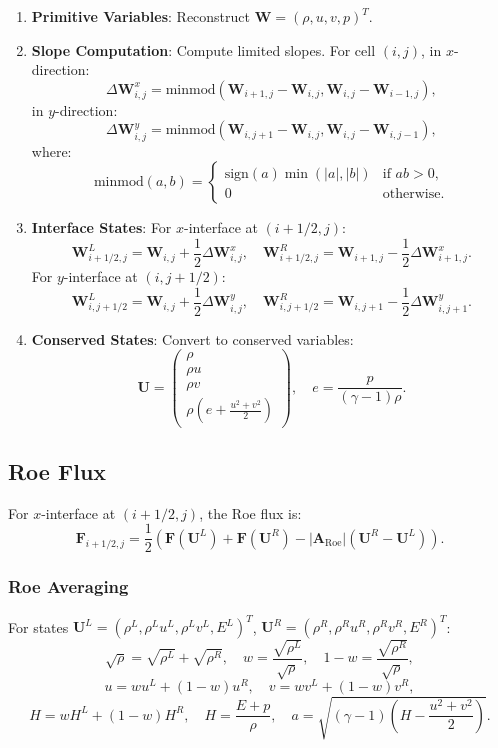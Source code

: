 \documentclass[a4paper,12pt]{article}
\begin{document}
\begin{enumerate}
    \item \textbf{Primitive Variables}: Reconstruct \(\mathbf{W} = (\rho, u, v, p)^T\).
    \item \textbf{Slope Computation}: Compute limited slopes. For cell \((i,j)\), in \(x\)-direction:
    \[
    \Delta \mathbf{W}_{i,j}^x = \text{minmod} \left( \mathbf{W}_{i+1,j} - \mathbf{W}_{i,j}, \mathbf{W}_{i,j} - \mathbf{W}_{i-1,j} \right),
    \]
    in \(y\)-direction:
    \[
    \Delta \mathbf{W}_{i,j}^y = \text{minmod} \left( \mathbf{W}_{i,j+1} - \mathbf{W}_{i,j}, \mathbf{W}_{i,j} - \mathbf{W}_{i,j-1} \right),
    \]
    where:
    \[
    \text{minmod}(a, b) = \begin{cases} 
    \text{sign}(a) \min(|a|, |b|) & \text{if } a b > 0, \\
    0 & \text{otherwise}.
    \end{cases}
    \]
    \item \textbf{Interface States}: For \(x\)-interface at \((i+1/2,j)\):
    \[
    \mathbf{W}_{i+1/2,j}^L = \mathbf{W}_{i,j} + \frac{1}{2} \Delta \mathbf{W}_{i,j}^x, \quad \mathbf{W}_{i+1/2,j}^R = \mathbf{W}_{i+1,j} - \frac{1}{2} \Delta \mathbf{W}_{i+1,j}^x.
    \]
    For \(y\)-interface at \((i,j+1/2)\):
    \[
    \mathbf{W}_{i,j+1/2}^L = \mathbf{W}_{i,j} + \frac{1}{2} \Delta \mathbf{W}_{i,j}^y, \quad \mathbf{W}_{i,j+1/2}^R = \mathbf{W}_{i,j+1} - \frac{1}{2} \Delta \mathbf{W}_{i,j+1}^y.
    \]
    \item \textbf{Conserved States}: Convert to conserved variables:
    \[
    \mathbf{U} = \begin{pmatrix} \rho \\ \rho u \\ \rho v \\ \rho \left( e + \frac{u^2 + v^2}{2} \right) \end{pmatrix}, \quad e = \frac{p}{(\gamma - 1) \rho}.
    \]
\end{enumerate}

\subsection*{Roe Flux}
For \(x\)-interface at \((i+1/2,j)\), the Roe flux is:
\[
\mathbf{F}_{i+1/2,j} = \frac{1}{2} \left( \mathbf{F}(\mathbf{U}^L) + \mathbf{F}(\mathbf{U}^R) - \left| \mathbf{A}_{\text{Roe}} \right| (\mathbf{U}^R - \mathbf{U}^L) \right).
\]

\subsubsection*{Roe Averaging}
For states \(\mathbf{U}^L = (\rho^L, \rho^L u^L, \rho^L v^L, E^L)^T\), \(\mathbf{U}^R = (\rho^R, \rho^R u^R, \rho^R v^R, E^R)^T\):
\[
\sqrt{\rho} = \sqrt{\rho^L} + \sqrt{\rho^R}, \quad w = \frac{\sqrt{\rho^L}}{\sqrt{\rho}}, \quad 1-w = \frac{\sqrt{\rho^R}}{\sqrt{\rho}},
\]
\[
u = w u^L + (1-w) u^R, \quad v = w v^L + (1-w) v^R,
\]
\[
H = w H^L + (1-w) H^R, \quad H = \frac{E + p}{\rho}, \quad a = \sqrt{(\gamma - 1) \left( H - \frac{u^2 + v^2}{2} \right)}.
\]
\end{document}
